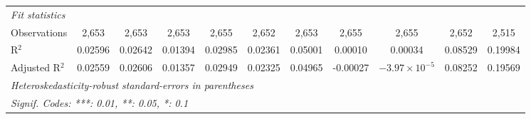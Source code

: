 \begin{tabular}{lcccccccccc}
   \midrule
   \emph{Fit statistics}\\
   Observations                              & 2,653           & 2,653           & 2,653           & 2,655           & 2,652           & 2,653           & 2,655         & 2,655                  & 2,652           & 2,515\\  
   R$^2$                                     & 0.02596         & 0.02642         & 0.01394         & 0.02985         & 0.02361         & 0.05001         & 0.00010       & 0.00034                & 0.08529         & 0.19984\\  
   Adjusted R$^2$                            & 0.02559         & 0.02606         & 0.01357         & 0.02949         & 0.02325         & 0.04965         & -0.00027      & $-3.97\times 10^{-5}$  & 0.08252         & 0.19569\\  
   \midrule \midrule
   \multicolumn{11}{l}{\emph{Heteroskedasticity-robust standard-errors in parentheses}}\\
   \multicolumn{11}{l}{\emph{Signif. Codes: ***: 0.01, **: 0.05, *: 0.1}}\\
\end{tabular}
\par\endgroup


